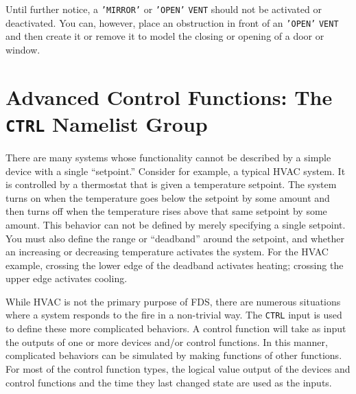 \documentclass[11pt]{book}
\newcommand{\ct}{\tt\small}
\begin{document}
\begin{warning}
Until further notice, a {\ct 'MIRROR'} or {\ct 'OPEN'} {\ct VENT} should not be activated or deactivated.
You can, however, place an obstruction in front of an {\ct 'OPEN'} {\ct VENT} and then create it or remove it to model the closing or opening of a door or
window.
\end{warning}



\newpage

\section{Advanced Control Functions: The \texorpdfstring{{\tt CTRL}}{CTRL} Namelist Group}
\label{info:CTRL}

There are many systems whose functionality cannot be described by a simple device with a single ``setpoint.''
Consider for example, a typical HVAC system.  It is controlled by a thermostat that is given a temperature setpoint.
The system turns on when the temperature goes below the setpoint by some
amount and then turns off when the temperature rises above that same setpoint by some amount.
This behavior can not be defined by merely specifying a single setpoint.
You must also define the range or ``deadband'' around the setpoint, and whether an
increasing or decreasing temperature activates the system.  For the HVAC example, crossing the
lower edge of the deadband activates heating; crossing the upper edge activates cooling.

While HVAC is not the primary purpose of FDS, there are numerous situations where a system responds to
the fire in a non-trivial way.  The {\ct CTRL} input is used to define these more complicated behaviors.
A control function will take as input the outputs of one or more devices and/or control functions.
In this manner, complicated behaviors can be simulated by making functions of other functions.  For most of the
control function types, the logical value output of the devices and control functions and the time they last changed
state are used as the inputs.
\end{document}
